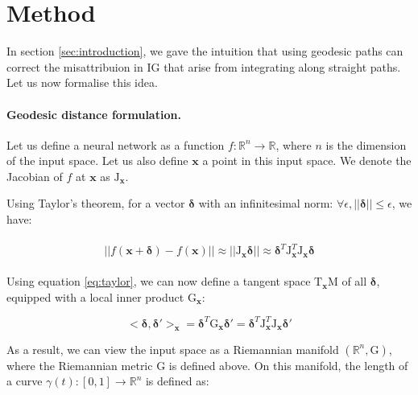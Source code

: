 \section{Method}
\label{sec:method}

In section \ref{sec:introduction}, we gave the intuition that using geodesic paths can correct the misattribuion in IG that arise from integrating along straight paths. Let us now formalise this idea.

\paragraph{Geodesic distance formulation.} Let us define a neural network as a function $f: \mathbb{R}^n \to \mathbb{R}$, where $n$ is the dimension of the input space. Let us also define $\textbf{x}$ a point in this input space. We denote the Jacobian of $f$ at $\textbf{x}$ as $\textrm{J}_{\textbf{x}}$.

Using Taylor's theorem, for a vector $\boldsymbol{\delta}$ with an infinitesimal norm: $\forall \epsilon, ||\boldsymbol{\delta}|| \le \epsilon$, we have:

\begin{align}
\begin{split}
    ||f(\textbf{x} + \boldsymbol{\delta}) - f(\textbf{x})|| \approx ||\textrm{J}_{\textbf{x}}\boldsymbol{\delta}|| \approx \boldsymbol{\delta}^T \textrm{J}_{\textbf{x}}^T \textrm{J}_{\textbf{x}} \boldsymbol{\delta}
\end{split}
\label{eq:taylor}
\end{align}

Using equation \ref{eq:taylor}, we can now define a tangent space $\textrm{T}_\textbf{x}\textrm{M}$ of all $\boldsymbol{\delta}$, equipped with a local inner product $\textrm{G}_\textbf{x}$:

\begin{equation}
    <\boldsymbol{\delta}, \boldsymbol{\delta'}>_\textbf{x} = \boldsymbol{\delta}^T \textrm{G}_\textbf{x} \boldsymbol{\delta'}
    = \boldsymbol{\delta}^T \textrm{J}_{\textbf{x}}^T \textrm{J}_{\textbf{x}}\boldsymbol{\delta'}
\label{eq:inner_product}
\end{equation}

As a result, we can view the input space as a Riemannian manifold $(\mathbb{R}^n, \textrm{G})$, where the Riemannian metric $\textrm{G}$ is defined above. On this manifold, the length of a curve $\gamma(t): [0, 1] \to \mathbb{R}^n$ is defined as:

